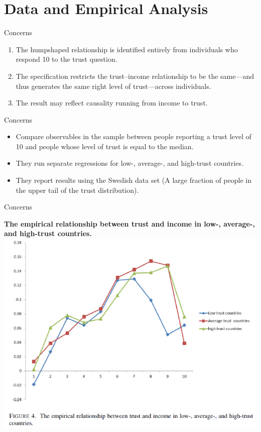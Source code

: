 \documentclass[pdftex,12pt,xcolor=pdftex,table]{beamer}
\begin{document}
\section{Data and Empirical Analysis}
\begin{frame}{Concerns}
    \begin{enumerate}
        \item The humpshaped
relationship is identified entirely from individuals who respond 10 to the
trust question.
        \item The specification
restricts the trust–income relationship to be the same—and thus generates the same
right level of trust—across individuals.
\item The result may reflect causality running from income to trust.
    \end{enumerate}
\end{frame}

\begin{frame}{Concerns}
\begin{itemize}
    \item Compare observables in the
sample between people reporting a trust level of 10 and people whose level of trust
is equal to the median.
    \item They run separate regressions for low-, average-, and high-trust countries.
    \item They report results using the Swedish data set (A large fraction of people in the upper tail of the trust distribution).
\end{itemize}
\end{frame}

\begin{frame}{Concerns}
    \begin{center}
            \textbf{The empirical relationship between trust and income in low-, average-, and high-trust
countries.}
        \includegraphics[scale=0.52]{figure_4.PNG}
    \end{center}
\end{frame}
\end{document}
